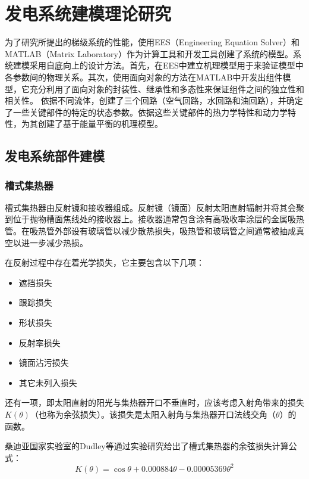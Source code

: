 \chapter{发电系统建模理论研究}
\label{cha:Modeling}

为了研究所提出的梯级系统的性能，使用EES（Engineering Equation Solver）和MATLAB（Matrix Laboratory）作为计算工具和开发工具创建了系统的模型。系统建模采用自底向上的设计方法。首先，在EES中建立机理模型用于来验证模型中各参数间的物理关系。其次，使用面向对象的方法在MATLAB中开发出组件模型，它充分利用了面向对象的封装性、继承性和多态性来保证组件之间的独立性和相关性。
依据不同流体，创建了三个回路（空气回路，水回路和油回路），并确定了一些关键部件的特定的状态参数。依据这些关键部件的热力学特性和动力学特性，为其创建了基于能量平衡的机理模型。

\section{发电系统部件建模}
\subsection{槽式集热器}
\label{sec:ptc}

槽式集热器由反射镜和接收器组成。反射镜（镜面）反射太阳直射辐射并将其会聚到位于抛物槽面焦线处的接收器上。接收器通常包含涂有高吸收率涂层的金属吸热管。在吸热管外部设有玻璃管以减少散热损失，吸热管和玻璃管之间通常被抽成真空以进一步减少热损。

在反射过程中存在着光学损失，它主要包含以下几项\cite{Price2002}：

\begin{itemize}
  \item 遮挡损失
  \item 跟踪损失
  \item 形状损失
  \item 反射率损失
  \item 镜面沾污损失
  \item 其它未列入损失
\end{itemize}

还有一项，即太阳直射的阳光与集热器开口不垂直时，应该考虑入射角带来的损失$K(\theta)$（也称为余弦损失）。该损失是太阳入射角与集热器开口法线交角（$\theta$）的函数。

桑迪亚国家实验室的Dudley等\cite{Dudley1994}通过实验研究给出了槽式集热器的余弦损失计算公式：
\begin{equation}
  K(\theta) = \cos\theta+0.000884\theta-0.00005369\theta^2
\end{equation}

